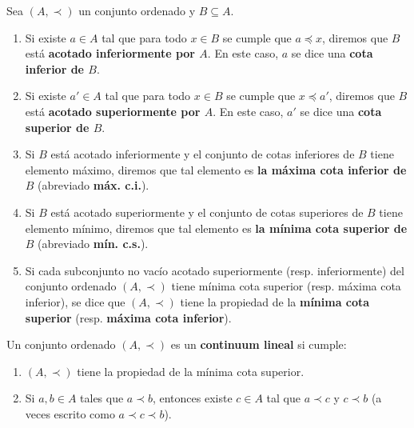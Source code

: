 \documentclass[12pt]{report}
\theoremstyle{largebreak}
\begin{document}
    \begin{mydef}
        Sea $(A,\prec)$ un conjunto ordenado y $B\subseteq A$. 
        \begin{enumerate}
            \item Si existe $a\in A$ tal que para todo $x\in B$ se cumple que $a\preceq x$, diremos que $B$ está \textbf{acotado inferiormente por $A$}. En este caso, $a$ se dice una \textbf{cota inferior de $B$}.
            \item Si existe $a'\in A$ tal que para todo $x\in B$ se cumple que $x\preceq a'$, diremos que $B$ está \textbf{acotado superiormente por $A$}. En este caso, $a'$ se dice una \textbf{cota superior de $B$}.
            \item Si $B$ está acotado inferiormente y el conjunto de cotas inferiores de $B$ tiene elemento máximo, diremos que tal elemento es \textbf{la máxima cota inferior de $B$} (abreviado \textbf{máx. c.i.}).
            \item Si $B$ está acotado superiormente y el conjunto de cotas superiores de $B$ tiene elemento mínimo, diremos que tal elemento es \textbf{la mínima cota superior de $B$} (abreviado \textbf{mín. c.s.}).
            \item Si cada subconjunto no vacío acotado superiormente (resp. inferiormente) del conjunto ordenado $(A,\prec)$ tiene mínima cota superior (resp. máxima cota inferior), se dice que $(A,\prec)$ tiene la propiedad de la \textbf{mínima cota superior} (resp. \textbf{máxima cota inferior}).
        \end{enumerate}
    \end{mydef}

    \begin{mydef}
        Un conjunto ordenado $(A,\prec)$ es un \textbf{continuum lineal} si cumple:
        \begin{enumerate}
            \item $(A,\prec)$ tiene la propiedad de la mínima cota superior.
            \item Si $a,b\in A$ tales que $a\prec b$, entonces existe $c\in A$ tal que $a\prec c$ y $c\prec b$ (a veces escrito como $a\prec c\prec b$).
        \end{enumerate}
    \end{mydef}
\end{document}
